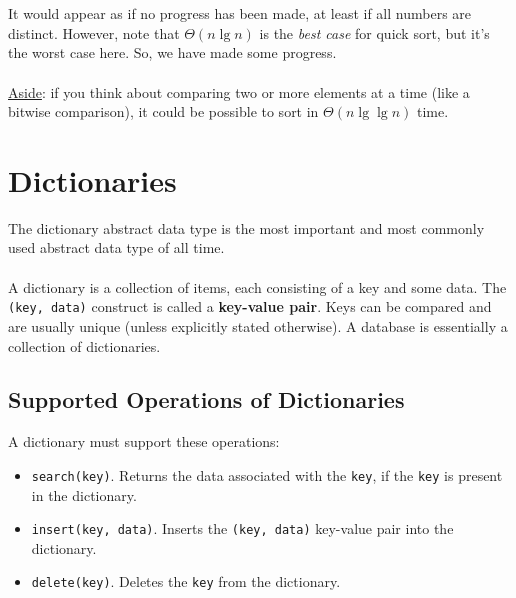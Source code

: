 \documentclass[]{article}
\theoremstyle{definition}
\begin{document}
					\\ \\
					It would appear as if no progress has been made, at least if all numbers are distinct. However, note that $\Theta(n \lg n)$ is the \emph{best case} for quick sort, but it's the worst case here. So, we have made some progress.
					\\ \\
					\underline{Aside}: if you think about comparing two or more elements at a time (like a bitwise comparison), it could be possible to sort in $\Theta(n \lg \lg n)$ time.
	\section{Dictionaries}
		The dictionary abstract data type is the most important and most commonly used abstract data type of all time.
		\\ \\
		A dictionary is a collection of items, each consisting of a key and some data. The \verb+(key, data)+ construct is called a \textbf{key-value pair}. Keys can be compared and are usually unique (unless explicitly stated otherwise). A database is essentially a collection of dictionaries.

		\subsection{Supported Operations of Dictionaries}
			A dictionary must support these operations:
			\begin{itemize}
				\item \verb+search(key)+. Returns the data associated with the \verb+key+, if the \verb+key+ is present in the dictionary.
				\item \verb+insert(key, data)+. Inserts the \verb+(key, data)+ key-value pair into the dictionary.
				\item \verb+delete(key)+. Deletes the \verb+key+ from the dictionary.
			\end{itemize}
\end{document}
